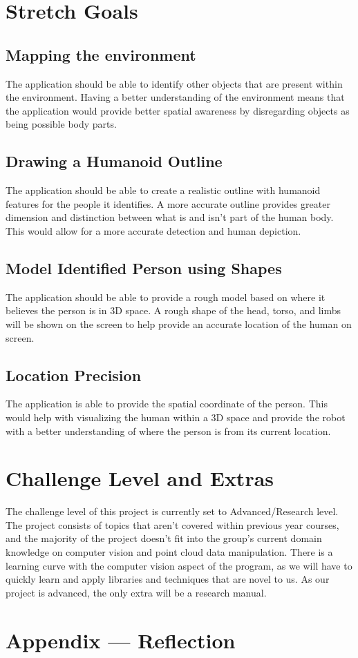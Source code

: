\documentclass{article}
\begin{document}
\newpage
\section{Stretch Goals}

\subsection{Mapping the environment}
The application should be able to identify other objects that are present within the environment. Having a better understanding of the environment means that the application would provide better spatial awareness by disregarding objects as being possible body parts.

\subsection{Drawing a Humanoid Outline}
The application should be able to create a realistic outline with humanoid features for the people it identifies. A more accurate outline provides greater dimension and distinction between what is and isn’t part of the human body. This would allow for a more accurate detection and human depiction.
  
\subsection{Model Identified Person using Shapes}
The application should be able to provide a rough model based on where it believes the person is in 3D space. A rough shape of the head, torso, and limbs will be shown on the screen to help provide an accurate location of the human on screen.

\subsection{Location Precision}
The application is able to provide the spatial coordinate of the person. This would help with visualizing the human within a 3D space and provide the robot with a better understanding of where the person is from its current location.

\section{Challenge Level and Extras}

The challenge level of this project is currently set to Advanced/Research level. The project consists of topics 
that aren't covered within previous year courses, and the majority of the project doesn't fit into the group's current domain knowledge on computer vision and point cloud data manipulation. 
There is a learning curve with the computer vision aspect of the program, as we will have to quickly learn and apply libraries and techniques that are novel to us. As our project is advanced, the only extra will be a research manual.


\newpage{}

\section*{Appendix --- Reflection}

   
\end{document}
